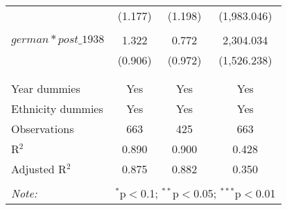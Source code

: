 \begin{table}[!htbp]
\begin{tabular}{@{\extracolsep{5pt}}lccc}
  & (1.177) & (1.198) & (1,983.046) \\ 
  & & & \\ 
 $german*post\_1938$ & 1.322 & 0.772 & 2,304.034 \\ 
  & (0.906) & (0.972) & (1,526.238) \\ 
  & & & \\ 
\hline \\[-1.8ex] 
Year dummies & Yes & Yes & Yes \\ 
Ethnicity dummies & Yes & Yes & Yes \\ 
Observations & 663 & 425 & 663 \\ 
R$^{2}$ & 0.890 & 0.900 & 0.428 \\ 
Adjusted R$^{2}$ & 0.875 & 0.882 & 0.350 \\ 
\hline 
\hline \\[-1.8ex] 
\textit{Note:}  & \multicolumn{3}{r}{$^{*}$p$<$0.1; $^{**}$p$<$0.05; $^{***}$p$<$0.01} \\ 
\end{tabular} 
\end{table} 
